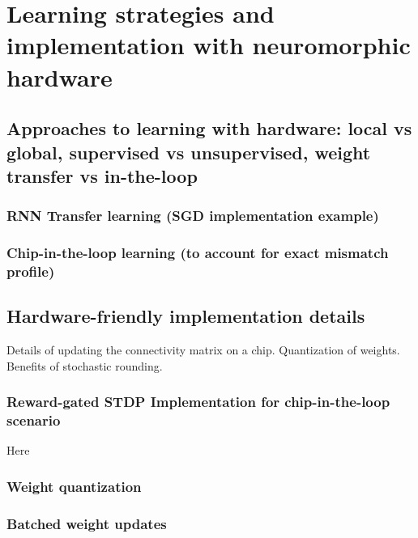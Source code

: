 \chapter{Learning strategies and implementation with neuromorphic hardware}
\label{ch:Plasticity_and_learning}

\section{Approaches to learning with hardware: local vs global, supervised vs unsupervised, weight transfer vs in-the-loop}

\subsection{RNN Transfer learning (SGD implementation example)}

\subsection{Chip-in-the-loop learning (to account for exact mismatch profile)}

\section{Hardware-friendly implementation details}

Details of updating the connectivity matrix on a chip. Quantization of weights.
Benefits of stochastic rounding. 

\subsection{Reward-gated STDP Implementation for chip-in-the-loop scenario}

Here 

\subsection{Weight quantization}
\subsection{Batched weight updates}
